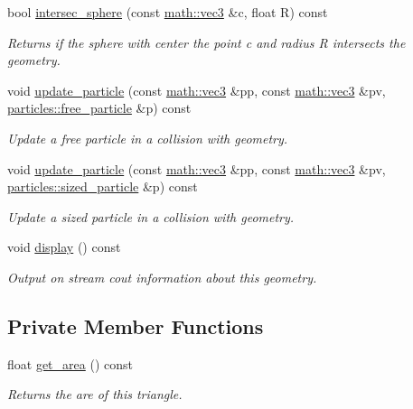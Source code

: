 \begin{DoxyCompactItemize}
bool \hyperlink{classphysim_1_1geometric_1_1triangle_a0cb72d1f970ef06df43206eb4b9cf19a}{intersec\+\_\+sphere} (const \hyperlink{structphysim_1_1math_1_1vec3}{math\+::vec3} \&c, float R) const
\begin{DoxyCompactList}\small\item\em Returns if the sphere with center the point {\itshape c} and radius {\itshape R} intersects the geometry. \end{DoxyCompactList}\item 
void \hyperlink{classphysim_1_1geometric_1_1triangle_a3285ad4d763703ed84a21b25420c84bc}{update\+\_\+particle} (const \hyperlink{structphysim_1_1math_1_1vec3}{math\+::vec3} \&pp, const \hyperlink{structphysim_1_1math_1_1vec3}{math\+::vec3} \&pv, \hyperlink{classphysim_1_1particles_1_1free__particle}{particles\+::free\+\_\+particle} \&p) const
\begin{DoxyCompactList}\small\item\em Update a free particle in a collision with geometry. \end{DoxyCompactList}\item 
void \hyperlink{classphysim_1_1geometric_1_1triangle_ae2551793ce8a5de01504326309c1543b}{update\+\_\+particle} (const \hyperlink{structphysim_1_1math_1_1vec3}{math\+::vec3} \&pp, const \hyperlink{structphysim_1_1math_1_1vec3}{math\+::vec3} \&pv, \hyperlink{classphysim_1_1particles_1_1sized__particle}{particles\+::sized\+\_\+particle} \&p) const
\begin{DoxyCompactList}\small\item\em Update a sized particle in a collision with geometry. \end{DoxyCompactList}\item 
\mbox{\label{classphysim_1_1geometric_1_1triangle_a201210e4f19d1579cd3b45fb9dc40476}} 
void \hyperlink{classphysim_1_1geometric_1_1triangle_a201210e4f19d1579cd3b45fb9dc40476}{display} () const
\begin{DoxyCompactList}\small\item\em Output on stream {\itshape cout} information about this geometry. \end{DoxyCompactList}\end{DoxyCompactItemize}
\subsection*{Private Member Functions}
\begin{DoxyCompactItemize}
\item 
\mbox{\label{classphysim_1_1geometric_1_1triangle_a1fe526392f86b9e4b34c55e6e466191b}} 
float \hyperlink{classphysim_1_1geometric_1_1triangle_a1fe526392f86b9e4b34c55e6e466191b}{get\+\_\+area} () const
\begin{DoxyCompactList}\small\item\em Returns the are of this triangle. \end{DoxyCompactList}\end{DoxyCompactItemize}
